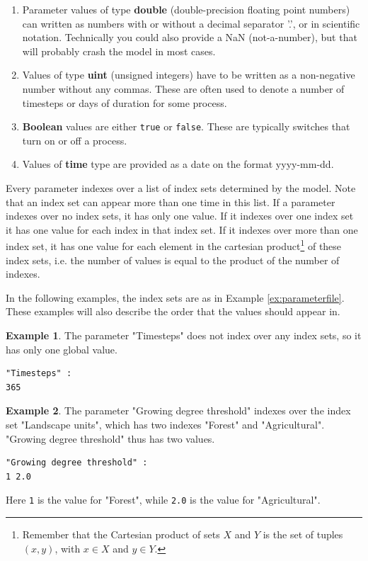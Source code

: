 \documentclass[11pt]{article}
\theoremstyle{definition}
\newtheorem{myexample}{Example}
\newenvironment{example}%
  {\begin{lrbox}{\examplebox}%
   \begin{minipage}{\dimexpr\linewidth-2\fboxsep}
   \begin{myexample}}%
  {\end{myexample}%
   \end{minipage}%
   \end{lrbox}%
   \begin{trivlist}
     \item[]\colorbox{silver}{\usebox\examplebox}
   \end{trivlist}}
\begin{document}
\begin{enumerate}[i]
\item Parameter values of type {\bf double} (double-precision floating point numbers) can written as numbers with or without a decimal separator '.', or in scientific notation. Technically you could also provide a NaN (not-a-number), but that will probably crash the model in most cases.
\item Values of type {\bf uint} (unsigned integers) have to be written as a non-negative number without any commas. These are often used to denote a number of timesteps or days of duration for some process.
\item {\bf Boolean} values are either {\tt true} or {\tt false}. These are typically switches that turn on or off a process.
\item Values of {\bf time} type are provided as a date on the format yyyy-mm-dd.
\end{enumerate}

Every parameter indexes over a list of index sets determined by the model. Note that an index set can appear more than one time in this list. If a parameter indexes over no index sets, it has only one value. If it indexes over one index set it has one value for each index in that index set. If it indexes over more than one index set, it has one value for each element in the cartesian product\footnote{Remember that the Cartesian product of sets $X$ and $Y$ is the set of tuples $(x, y)$, with $x\in X$ and $y\in Y$.} of these index sets, i.e. the number of values is equal to the product of the number of indexes.

In the following examples, the index sets are as in Example \ref{ex:parameterfile}. These examples will also describe the order that the values should appear in.

\begin{example}
The parameter "Timesteps" does not index over any index sets, so it has only one global value.
\begin{lstlisting}
"Timesteps" :
365
\end{lstlisting}
\end{example}

\begin{example}
The parameter "Growing degree threshold" indexes over the index set "Landscape units", which has two indexes "Forest" and "Agricultural". "Growing degree threshold" thus has two values.
\begin{lstlisting}
"Growing degree threshold" :
1 2.0
\end{lstlisting}
Here {\tt 1} is the value for "Forest", while {\tt 2.0} is the value for "Agricultural".
\end{example}
\end{document}
